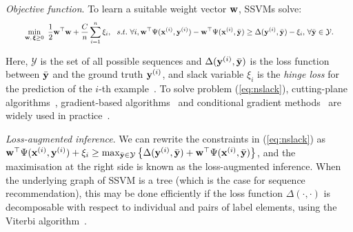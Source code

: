 \emph{Objective function}.
To learn a suitable weight vector $\mathbf{w}$, SSVMs solve: %
\begin{equation}
\label{eq:nslack}
\resizebox{0.93\linewidth}{!}{$\displaystyle
\begin{aligned}
\min_{\w, \, \bm{\xi} \ge 0} ~\frac{1}{2} \w^\top \w + \frac{C}{n} \sum_{i=1}^n \xi_i,  ~~s.t.~  \forall i, 
  \w^\top \Psi(\x^{(i)}, \y^{(i)}) - \w^\top \Psi(\x^{(i)}, \bar{\y}) \ge
  \Delta(\y^{(i)}, \bar{\y}) - \xi_i, \, \forall \bar\y \in \mathcal{Y}.
\end{aligned}
$} \eqmoveup
\end{equation}

Here, 
$\mathcal{Y}$ is the set of all possible sequences
and $\Delta(\mathbf{y}^{({i})}, \bar{\mathbf{y}})$ is the loss function between $\bar{\mathbf{y}}$ and the ground truth $\mathbf{y}^{({i})}$,
and slack variable $\xi_i$ is the \emph{hinge loss} for the prediction of the $i$-th example~\cite{tsochantaridis2005large}.
To solve problem (\ref{eq:nslack}),
cutting-plane algorithms~\cite{joachims2009predicting}, %
gradient-based algorithms~\cite{ratliff2006subgradient} %
and conditional gradient methods~\cite{lacoste2013block} %
are widely used in practice~\cite{muller2014methods}. 


\emph{Loss-augmented inference}.
We can rewrite the constraints in (\ref{eq:nslack}) as 
$\mathbf{w}^\top \Psi(\mathbf{x}^{({i})}, \mathbf{y}^{({i})}) + \xi_i \ge 
\max_{\bar{\mathbf{y}} \in \mathcal{Y}} \left\{ \Delta(\mathbf{y}^{({i})}, \bar{\mathbf{y}}) + \mathbf{w}^\top \Psi(\mathbf{x}^{({i})}, \bar{\mathbf{y}}) \right\}$,
and the maximisation at the right side is known as the loss-augmented inference.
When the underlying graph of SSVM is a tree (which is the case for sequence recommendation),
this may be done efficiently if the loss function $\Delta(\cdot,\cdot)$ is decomposable
with respect to individual and pairs of label elements,
\eg using the Viterbi algorithm~\cite{joachims2009predicting}.

